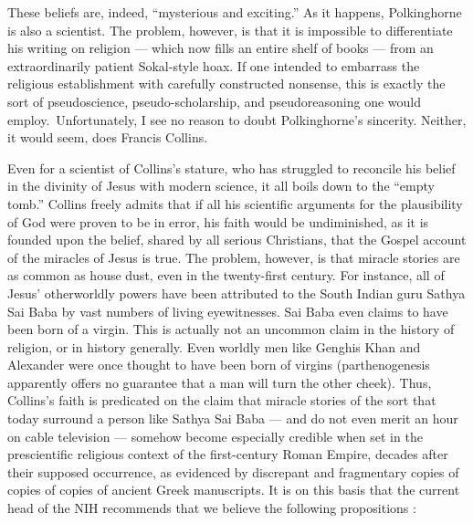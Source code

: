 \documentclass[a4paper,14pt]{extarticle}
\begin{document}
These beliefs are, indeed, ``mysterious and exciting.''
As it happens, Polkinghorne is also a scientist.
The problem, however, is that it is impossible to differentiate his writing on religion --- which now fills an entire shelf of books --- from an extraordinarily  patient Sokal-style hoax.
If one intended to embarrass the religious establishment with carefully constructed nonsense, this is exactly the sort of pseudoscience, pseudo-scholarship, and pseudoreasoning one would employ.\
Unfortunately, I see no reason to doubt Polkinghorne’s sincerity.
Neither, it would seem, does Francis Collins.

Even for a scientist of Collins’s stature, who has struggled to reconcile his belief in the divinity of Jesus with modern science, it all boils down to the ``empty tomb.''
Collins freely admits that if all his scientific arguments for the plausibility of God were proven to be in error, his faith would be undiminished, as it is founded upon the belief, shared by all serious Christians, that the Gospel account of the miracles of Jesus is true.
The problem, however, is that miracle stories are as common as house dust, even in the twenty-first century.
For instance, all of Jesus’ otherworldly powers have been attributed to the South Indian guru Sathya Sai Baba by vast numbers of living eyewitnesses.
Sai Baba even claims to have been born of a virgin.
This is actually not an uncommon claim in the history of religion, or in history generally.
Even worldly men like Genghis Khan and Alexander were once thought to have been born of virgins (parthenogenesis apparently offers no guarantee that a man will turn the other cheek).
Thus, Collins’s faith is predicated on the claim that miracle stories of the sort that today surround a person like Sathya Sai Baba --- and do not even merit an hour on cable television --- somehow become especially credible when set in the prescientific religious context of the first-century Roman Empire, decades after their supposed occurrence, as evidenced by discrepant and fragmentary copies of copies of copies of ancient Greek manuscripts.
It is on this basis that the current head of the NIH recommends that we believe the following propositions :
\end{document}
